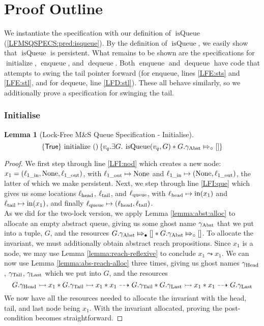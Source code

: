 \documentclass[a4paper, 10pt]{report}
\theoremstyle{definition}
\newtheorem{lemma}[theorem]{Lemma}
\newcommand{\initialise}{\operatorname{initialize}}
\newcommand{\enqueue}{\operatorname{enqueue}}
\newcommand{\dequeue}{\operatorname{dequeue}}
\newcommand{\msq}{M\&S Queue}
\newcommand{\lfmsq}{Lock-Free \msq{}}
\newcommand{\isqueue}{\operatorname{isQueue}}
\newcommand{\vq}{v_q}
\newcommand{\locinM}[1]{\loc_{#1\_\mathrm{in}}}
\newcommand{\locoutM}[1]{\loc_{#1\_\mathrm{out}}}
\newcommand{\locN}[1]{\loc_{\mathrm{#1}}}
\newcommand{\lochead}{\locN{head}}
\newcommand{\loctail}{\locN{tail}}
\newcommand{\locqueue}{\locN{queue}}
\newcommand{\nIn}[1]{\operatorname{in}(#1)}
\newcommand{\node}{x}
\newcommand{\nodeM}[1]{\node_{#1}}
\newcommand{\Qg}{G}
\newcommand{\gabst}{\gname_{\mathrm{Abst}}}
\newcommand{\ghead}{\gname_{\mathrm{Head}}}
\newcommand{\gtail}{\gname_{\mathrm{Tail}}}
\newcommand{\glast}{\gname_{\mathrm{Last}}}
\newcommand{\abstractstatefullfrag}[2]{#1 \Mapsto_{\circ} #2}
\newcommand{\abstractstateauth}[2]{#1 \Mapsto_{\bullet} #2}
\newcommand{\reach}[2]{#1 \leadsto #2}
\newcommand{\ar}[2]{#1 \dashrightarrow #2}
\newcommand{\ap}[2]{#1 \rightarrowtail #2}
\newcommand{\hocapspecinitHTGen}[2]{\hoare{\TRUE}{\initialise \ \TT}{#1 . \Exists #2 . \isqueue(#1, #2) \star{} \abstractstatefullfrag{#2.\gabst}{[]}}}
\newcommand{\hocapspecinitGen}[2]{\hocapspecinitHTGen{#1}{#2}}
\newcommand{\hocapspecinit}{\hocapspecinitGen{\vq}{\Qg}}
\begin{document}
\section{Proof Outline}
\label{LFMSQSPECS:section:proof-outline}

We instantiate the specification with our definition of $\isqueue$ (\ref{LFMSQSPECS:pred:isqueue}). By the definition of $\isqueue$, we easily show that $\isqueue$ is persistent. What remains to be shown are the specifications for $\initialise$, $\enqueue$, and $\dequeue$. Both $\enqueue$ and $\dequeue$ have code that attempts to swing the tail pointer forward (for enqueue, lines \ref{LFE:sts} and \ref{LFE:stl}, and for dequeue, line \ref{LFD:stl}). These all behave similarly, so we additionally prove a specification for swinging the tail.

\subsubsection{Initialise}
\begin{lemma}[\lfmsq{} Specification - Initialise]\label{LFMSQSPECS:spec:init}
  \begin{equation*}
    \hocapspecinit
  \end{equation*}
\end{lemma}
\begin{proof}
We first step through line \ref{LFI:nod} which creates a new node: $\nodeM{1} = (\locinM{1}, \None, \locoutM{1})$, with $\locoutM{1} \mapsto \None$ and $\locinM{1} \mapsto (\None, \locoutM{1})$, the latter of which we make persistent. Next, we step through line \ref{LFI:que} which gives us some locations $\lochead$, $\loctail$, and $\locqueue$, with $\lochead \mapsto \nIn{\nodeM{1}}$ and $\loctail \mapsto \nIn{\nodeM{1}}$, and finally $\locqueue \mapsto (\lochead, \loctail)$.\\
As we did for the two-lock version, we apply Lemma \ref{lemma:abst:alloc} to allocate an empty abstract queue, giving us some ghost name $\gabst$ that we put into a tuple, $\Qg$, and the resources $\abstractstateauth{\Qg.\gabst}{[]} \star{} \abstractstatefullfrag{\Qg.\gabst}{[]}$. To allocate the invariant, we must additionally obtain abstract reach propositions. Since $\nodeM{1}$ is a node, we may use Lemma \ref{lemma:reach-reflexive} to conclude $\reach{\nodeM{1}}{\nodeM{1}}$. We can now use Lemma \ref{lemma:abs-reach-alloc} three times, giving us ghost names $\ghead$, $\gtail$, $\glast$ which we put into $\Qg$, and the resources
\begin{equation*}
  \ap{\Qg.\ghead}{\nodeM{1}} \star{} \ap{\Qg.\gtail}{\nodeM{1}} \star{} \ar{\nodeM{1}}{\Qg.\gtail} \star{} \ap{\Qg.\glast}{\nodeM{1}} \star{} \ar{\nodeM{1}}{\Qg.\glast}
\end{equation*}
We now have all the resources needed to allocate the invariant with the head, tail, and last node being $\nodeM{1}$. With the invariant allocated, proving the post-condition becomes straightforward.
\end{proof}
\end{document}
